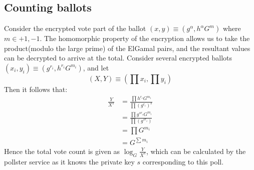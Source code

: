 \subsection{Counting ballots}

Consider the encrypted vote part of the ballot $(x,y) \equiv (g^\alpha, h^\alpha G^m)$
where $m \in {+1, -1}$.
The homomorphic property of the encryption allows us to take the product(modulo
the large prime) of the ElGamal pairs, and the resultant values can be decrypted to
arrive at the total.   Consider several encrypted ballots
$(x_i,y_i) \equiv (g^{r_i} , h^{r_i} G^{m_i})$, and let 
\[
(X,Y) \equiv (\prod x_i , \prod y_i) 
\]
Then it follows that:
\begin{equation} \label{eq5}
\begin{split}
  \frac{Y}{X^s} & = \frac{\prod h^{r_i} G^{m_i}}{ \prod (g^{r_i})^s } \\
  & =  \frac{\prod g^{sr_i} G^{m_i}}{ \prod (g^{sr_i}) } \\
  & = \prod G^{m_i} \\
   & = G^{\sum m_i}
\end{split}
\end{equation}
Hence the total vote count is given as $\log_G \frac{Y}{X^s}$, which can be
calculated by the pollster service as it knows the private key $s$ corresponding
to this poll.

